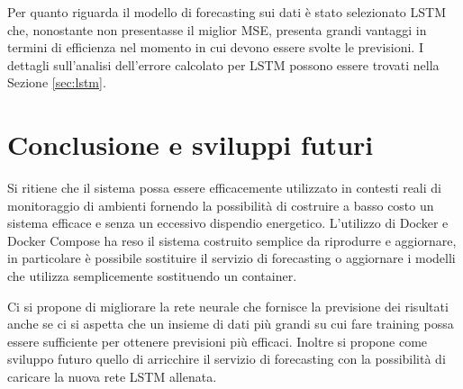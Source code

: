 \documentclass{article}
\begin{document}
Per quanto riguarda il modello di forecasting sui dati è stato selezionato LSTM che, nonostante non presentasse il miglior MSE, presenta grandi vantaggi in termini di efficienza nel momento in cui devono essere svolte le previsioni. I dettagli sull'analisi dell'errore calcolato per LSTM possono essere trovati nella Sezione \ref{sec:lstm}.





\section{Conclusione e sviluppi futuri}
Si ritiene che il sistema possa essere efficacemente utilizzato in contesti reali di monitoraggio di ambienti fornendo la possibilità di costruire a basso costo un sistema efficace e senza un eccessivo dispendio energetico. L'utilizzo di Docker e Docker Compose ha reso il sistema costruito semplice da riprodurre e aggiornare, in particolare è possibile sostituire il servizio di forecasting o aggiornare i modelli che utilizza semplicemente sostituendo un container. 

Ci si propone di migliorare la rete neurale che fornisce la previsione dei risultati anche se ci si aspetta che un insieme di dati più grandi su cui fare training possa essere sufficiente per ottenere previsioni più efficaci. Inoltre si propone come sviluppo futuro quello di arricchire il servizio di forecasting con la possibilità di caricare la nuova rete LSTM allenata.







\end{document}
